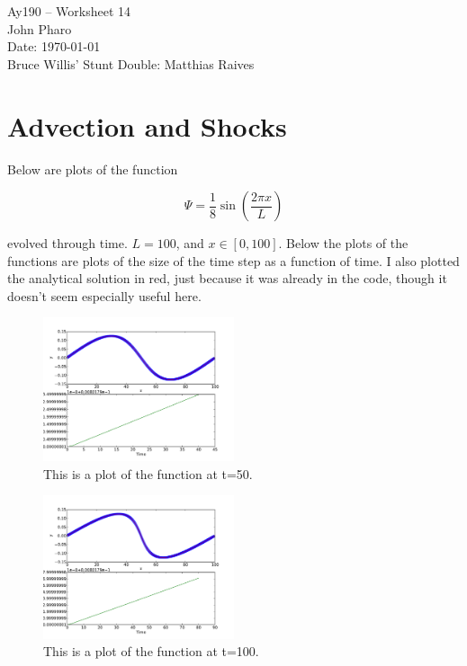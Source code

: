 \documentclass[11pt,letterpaper]{article}
\begin{document}
\begin{center}
\Large
Ay190 -- Worksheet 14\\
John Pharo\\
Date: \today\\
Bruce Willis' Stunt Double: Matthias Raives
\end{center}

\section*{Advection and Shocks}

Below are plots of the function 

$$ \Psi = \frac{1}{8}\sin \left( \frac{2 \pi x}{L} \right) $$

evolved through time. $L=100$, and $x \in [0,100]$. Below the plots of the functions are plots of the size of the time step as a function of time. I also plotted the analytical solution in red, just because it was already in the code, though it doesn't seem especially useful here.

\begin{figure}[bth]
\centering
\includegraphics[width=0.5\textwidth]{t=50.pdf}
\caption{This is a plot of the function at t=50.}
\label{fig:simpleplot2}
\end{figure}

\begin{figure}[bth]
\centering
\includegraphics[width=0.5\textwidth]{t=100.pdf}
\caption{This is a plot of the function at t=100.}
\label{fig:simpleplot2}
\end{figure}
\end{document}
